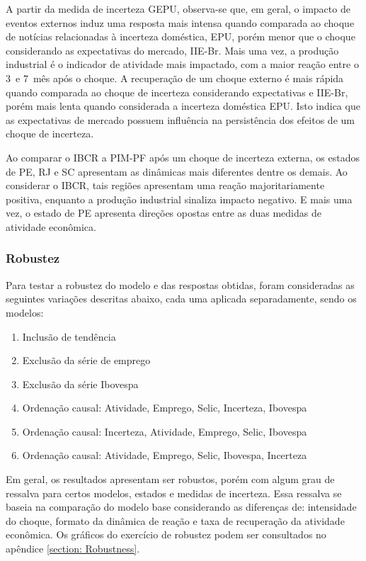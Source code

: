 A partir da medida de incerteza \gls{GEPU}, observa-se que, em geral, o impacto de eventos externos induz uma resposta mais intensa quando comparada ao choque de notícias relacionadas à incerteza doméstica, \gls{EPU}, porém menor que o choque considerando as expectativas do mercado, \gls{IIE-Br}. Mais uma vez, a produção industrial é o indicador de atividade mais impactado, com a maior reação entre o 3\textordmasculine\ e 7\textordmasculine\ mês após o choque. A recuperação de um choque externo é mais rápida quando comparada ao choque de incerteza considerando expectativas e \gls{IIE-Br}, porém mais lenta quando considerada a incerteza doméstica \gls{EPU}. Isto indica que as expectativas de mercado possuem influência na persistência dos efeitos de um choque de incerteza. 
\par

Ao comparar o \gls{IBCR} a \gls{PIM-PF} após um choque de incerteza externa, os estados de \gls{PE}, \gls{RJ} e \gls{SC} apresentam as dinâmicas mais diferentes dentre os demais. Ao considerar o \gls{IBCR}, tais regiões apresentam uma reação majoritariamente positiva, enquanto a produção industrial sinaliza impacto negativo. E mais uma vez, o estado de \gls{PE} apresenta direções opostas entre as duas medidas de atividade econômica. 

\subsubsection{Robustez}

Para testar a robustez do modelo e das respostas obtidas, foram consideradas as seguintes variações descritas abaixo, cada uma aplicada separadamente, sendo os modelos:

\begin{enumerate}
    \item[1] Inclusão de tendência
    \item[2] Exclusão da série de emprego
    \item[3] Exclusão da série Ibovespa
    \item[4] Ordenação causal: Atividade, Emprego, Selic, Incerteza, Ibovespa
    \item[5] Ordenação causal: Incerteza, Atividade, Emprego, Selic, Ibovespa
    \item[6] Ordenação causal: Atividade, Emprego, Selic, Ibovespa, Incerteza
\end{enumerate}
Em geral, os resultados apresentam ser robustos, porém com algum grau de ressalva para certos modelos, estados e medidas de incerteza. Essa ressalva se baseia na comparação do modelo base considerando as diferenças de: intensidade do choque, formato da dinâmica de reação e taxa de recuperação da atividade econômica. Os gráficos do exercício de robustez podem ser consultados no apêndice \ref{section: Robustness}.

